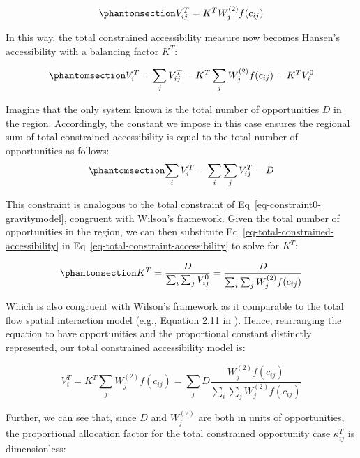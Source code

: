 \documentclass[
  10pt,
  letterpaper,
]{article}
\begin{document}
\begin{equation}\phantomsection\label{eq-total-constrained-access}{
V^T_{ij} = K^T  W_j^{(2)}  f(c_{ij})
}\end{equation}

In this way, the total constrained accessibility measure now becomes
Hansen's accessibility with a balancing factor \(K^T\):

\begin{equation}\phantomsection\label{eq-total-constrained-accessibility}{
V^T_i = \sum_j V^T_{ij} = K^T \sum_j W^{(2)}_jf(c_{ij}) = K^T  V^0_i
}\end{equation}

Imagine that the only system known is the total number of opportunities
\(D\) in the region. Accordingly, the constant we impose in this case
ensures the regional sum of total constrained accessibility is equal to
the total number of opportunities as follows:
\begin{equation}\phantomsection\label{eq-total-constraint-accessibility}{
\sum_i V^T_{i} = \sum_i\sum_j V^T_{ij} = D
}\end{equation}

This constraint is analogous to the total constraint of
Eq~\ref{eq-constraint0-gravitymodel}, congruent with Wilson's framework.
Given the total number of opportunities in the region, we can then
substitute Eq~\ref{eq-total-constrained-accessibility} in
Eq~\ref{eq-total-constraint-accessibility} to solve for \(K^T\):

\begin{equation}\phantomsection\label{eq-total-opportunity-balancing-factor}{
K^T =\frac{D}{\sum_i\sum_j V^0_{ij}} = \frac{D}{\sum_i\sum_j W^{(2)}_jf(c_{ij})}
}\end{equation}

Which is also congruent with Wilson's framework as it comparable to the
total flow spatial interaction model (e.g., Equation 2.11 in
\citep{cliff_evaluating_1974}). Hence, rearranging the equation to have
opportunities and the proportional constant distinctly represented, our
total constrained accessibility model is:

\[
V^T_i = K^T\sum_j W^{(2)}_jf(c_{ij}) = \sum_j D\frac{W^{(2)}_j f(c_{ij})}{\sum_i\sum_j W^{(2)}_jf(c_{ij})}
\]

Further, we can see that, since \(D\) and \(W^{(2)}_j\) are both in
units of opportunities, the proportional allocation factor for the total
constrained opportunity case \(\kappa_{ij}^T\) is dimensionless:
\end{document}
